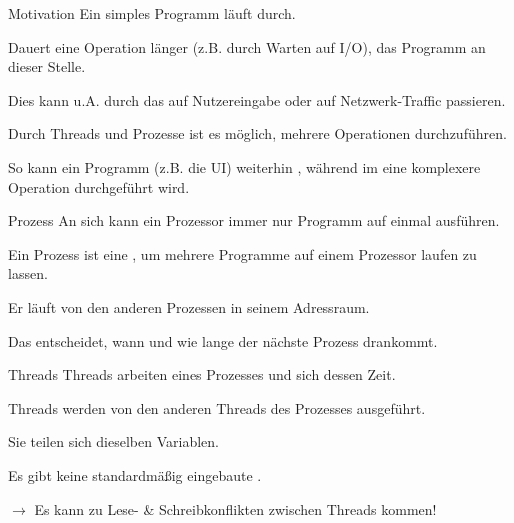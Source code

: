 \documentclass[12pt, aspectratio=169, usepdftitle=false, handout]{beamer}
\begin{document}
\begin{frame}[fragile]{Motivation}
    	 Ein simples Programm läuft  durch.
	
		\medskip
		
		Dauert eine Operation länger (z.B. durch Warten auf I/O),  das Programm an dieser Stelle.
		
		\medskip
		
		Dies kann u.A. durch das  auf Nutzereingabe oder auf Netzwerk-Traffic passieren.
		
		\medskip
		
		Durch Threads und Prozesse ist es möglich, mehrere Operationen  durchzuführen.
		
		\medskip
		
		So kann ein Programm (z.B. die UI) weiterhin , während im  eine komplexere Operation durchgeführt wird.
		
\end{frame}



\begin{frame}[fragile]{Prozess}
	    An sich kann ein Prozessor immer nur  Programm auf einmal ausführen.
		\pause
		
		\medskip
		
		Ein Prozess ist eine , um mehrere Programme  auf einem Prozessor laufen zu lassen.
		\pause
		
		\medskip
		
		Er läuft  von den anderen Prozessen in seinem  Adressraum.
		\pause
		
		\medskip
		
		Das  entscheidet, wann und wie lange der nächste Prozess drankommt.

\end{frame}


\begin{frame}[fragile]{Threads}
        Threads arbeiten  eines Prozesses und  sich dessen Zeit.
		\pause
		
		\medskip
		
		Threads werden  von den anderen Threads des Prozesses ausgeführt.
		\pause
		
		\medskip
		
		Sie teilen sich dieselben  Variablen.
		\pause
		
		\medskip
		
		Es gibt keine standardmäßig eingebaute .
		
		\medskip
		
		$\rightarrow$ Es kann zu Lese- \& Schreibkonflikten zwischen Threads kommen!


\end{frame}
\end{document}

